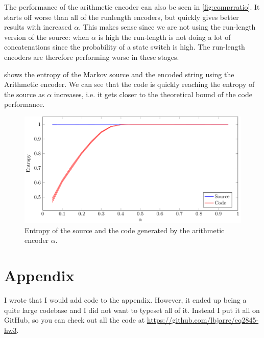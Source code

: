 \documentclass{article}
\begin{document}
The performance of the arithmetic encoder can also be seen in \cref{fig:comprratio}.
It starts off worse than all of the runlength encoders,
but quickly gives better results with increased $\alpha$.
This makes sense since we are not using the run-length version of the source:
when $\alpha$ is high the run-length is not doing a lot of concatenations
since the probability of a state switch is high.
The run-length encoders are therefore performing worse in these stages.

 shows the entropy of the Markov source and the encoded string using the Arithmetic encoder.
We can see that the code is quickly reaching the entropy of the source as $\alpha$ increases,
i.e. it gets closer to the theoretical bound of the code performance.

\begin{figure}[!ht]
  \centering
  \includegraphics{../tikz/entropy/entropy.pdf}
  \caption{Entropy of the source and the code generated by the arithmetic encoder $\alpha$.}
  \label{fig:entropy}
\end{figure}

\newpage
\section{Appendix}
I wrote that I would add code to the appendix.
However, it ended up being a quite large codebase
and I did not want to typeset all of it.
Instead I put it all on GitHub,
so you can check out all the code at
\href{https://github.com/lbjarre/eq2845-hw3}{https://github.com/lbjarre/eq2845-hw3}.
\end{document}
